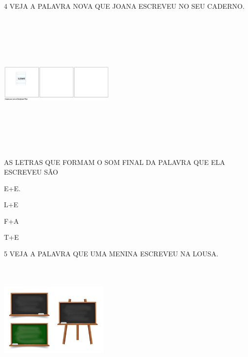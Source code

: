 \num{4} VEJA A PALAVRA NOVA QUE JOANA ESCREVEU NO SEU CADERNO.

\includegraphics[width=2.24931in,height=2.80435in]{media/image230.png}

AS LETRAS QUE FORMAM O SOM FINAL DA PALAVRA QUE ELA ESCREVEU SÃO

\begin{escolha}
\item E+E.

\item L+E

\item F+A

\item T+E
\end{escolha}

\num{5} VEJA A PALAVRA QUE UMA MENINA ESCREVEU NA LOUSA.

\includegraphics[width=2.13044in,height=2.33234in]{media/image231.jpg}


